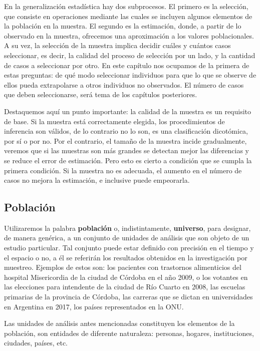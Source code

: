 \documentclass[]{article}
\begin{document}
En la generalización estadística hay dos subprocesos. El primero es la selección, que consiste en operaciones mediante las cuales se incluyen algunos elementos de la población en la muestra. El segundo es la estimación, donde, a partir de lo observado en la muestra, ofrecemos una aproximación a los valores poblacionales. A su vez, la selección de la muestra implica decidir cuáles y cuántos casos seleccionar, es decir, la calidad del proceso de selección por un lado, y la cantidad de casos a seleccionar por otro. En este capítulo nos ocupamos de la primera de estas preguntas: de qué modo seleccionar individuos para que lo que se observe de ellos pueda extrapolarse a otros individuos no observados. El número de casos que deben seleccionarse, será tema de los capítulos posteriores.

Destaquemos aquí un punto importante: la calidad de la muestra es un requisito de base. Si la muestra está correctamente elegida, los procedimientos de inferencia son válidos, de lo contrario no lo son, es una clasificación dicotómica, por sí o por no. Por el contrario, el tamaño de la muestra incide gradualmente, veremos que si las muestras son más grandes se detectan mejor las diferencias y se reduce el error de estimación. Pero esto es cierto a condición que se cumpla la primera condición. Si la muestra no es adecuada, el aumento en el número de casos no mejora la estimación, e inclusive puede empeorarla.

\hypertarget{poblacion}{%
\subsection{Población}\label{poblacion}}

Utilizaremos la palabra \textbf{población} o, indistintamente, \textbf{universo},
para designar, de manera genérica, a un conjunto de unidades de análisis
que son objeto de un estudio particular. Tal conjunto puede estar
definido con precisión en el tiempo y el espacio o no, a él se referirán
los resultados obtenidos en la investigación por muestreo. Ejemplos de
estos son: los pacientes con trastornos alimenticios del hospital
Misericordia de la ciudad de Córdoba en el año 2009, o los votantes en
las elecciones para intendente de la ciudad de Río Cuarto en 2008, las
escuelas primarias de la provincia de Córdoba, las carreras que se
dictan en universidades en Argentina en 2017, los países representados en la ONU.

Las unidades de análisis antes mencionadas constituyen los elementos de la población, son entidades de diferente naturaleza: personas, hogares, instituciones, ciudades, países, etc.
\end{document}
